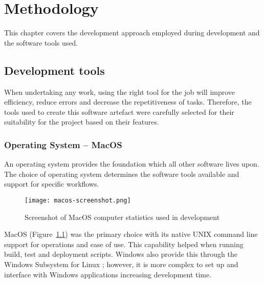 \chapter{Methodology} %
\label{Chapter3} %

This chapter covers the development approach employed during development and the software tools used.


\section{Development tools}
When undertaking any work, using the right tool for the job will improve efficiency, reduce errors and decrease the repetitiveness of tasks. Therefore, the tools used to create this software artefact were carefully selected for their suitability for the project based on their features.

\subsection{Operating System -- MacOS}
An operating system provides the foundation which all other software lives upon. The choice of operating system determines the software tools available and support for specific workflows.

\begin{figure}[ht!]
    \centerline{\texttt{[image: macos-screenshot.png]}}
    \caption{Screenshot of MacOS computer statistics used in development}
    \label{fig:macos}
\end{figure}

MacOS (Figure~\ref{fig:macos}) was the primary choice with its native UNIX command line support for operations \parencite{robbins_unix_2006} and ease of use. This capability helped when running build, test and deployment scripts. Windows also provide this through the Windows Subsystem for Linux \parencite{ionescu_alternatives_2019}; however, it is more complex to set up and interface with Windows applications increasing development time.

